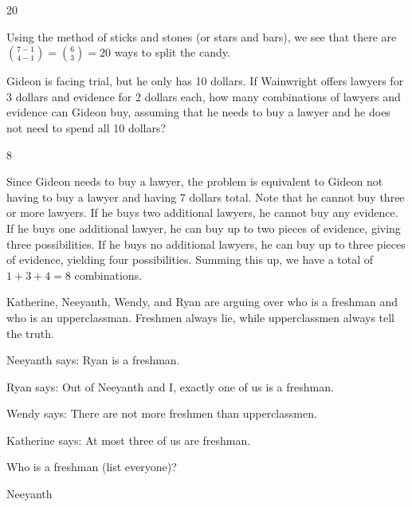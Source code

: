\documentclass[11pt]{article}
\begin{document}
\begin{answer}
20
\end{answer}

\begin{solution}
Using the method of sticks and stones (or stars and bars), we see that there are ${{7-1} \choose {4-1}} = {6 \choose 3} = \boxed{20}$ ways to split the candy.
\end{solution}

\begin{problem}
Gideon is facing trial, but he only has 10 dollars. If Wainwright offers lawyers for 3 dollars and evidence for 2 dollars each, how many combinations of lawyers and evidence can Gideon buy, assuming that he needs to buy a lawyer and he does not need to spend all 10 dollars?
\end{problem}

\begin{answer}
8
\end{answer}

\begin{solution}
Since Gideon needs to buy a lawyer, the problem is equivalent to Gideon not having to buy a lawyer and having 7 dollars total. Note that he cannot buy three or more lawyers. If he buys two additional lawyers, he cannot buy any evidence. If he buys one additional lawyer, he can buy up to two pieces of evidence, giving three possibilities. If he buys no additional lawyers, he can buy up to three pieces of evidence, yielding four possibilities. Summing this up, we have a total of $1+3+4=\boxed{8}$ combinations.
\end{solution}

\begin{problem}
Katherine, Neeyanth, Wendy, and Ryan are arguing over who is a freshman and who is an upperclassman. Freshmen always lie, while upperclassmen always tell the truth. 
    
Neeyanth says: Ryan is a freshman.
    
Ryan says: Out of Neeyanth and I, exactly one of us is a freshman.

Wendy says: There are not more freshmen than upperclassmen.
    
Katherine says: At most three of us are freshman.
    
\noindent Who is a freshman (list everyone)?
\end{problem}

\begin{answer}
Neeyanth
\end{answer}
\end{document}

